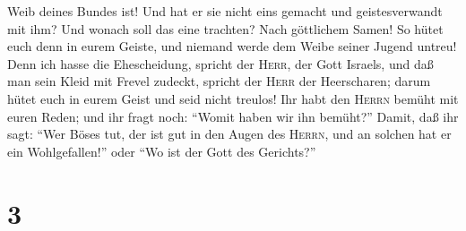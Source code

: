 Weib deines Bundes ist!  Und hat er sie nicht eins
gemacht und geistesverwandt mit ihm? Und wonach soll das eine trachten?
Nach göttlichem Samen! So hütet euch denn in eurem Geiste, und niemand
werde dem Weibe seiner Jugend untreu!  Denn ich hasse die
Ehescheidung, spricht der \textsc{Herr}, der Gott Israels, und daß man
sein Kleid mit Frevel zudeckt, spricht der \textsc{Herr} der
Heerscharen; darum hütet euch in eurem Geist und seid nicht treulos!
 Ihr habt den \textsc{Herrn} bemüht mit euren Reden; und
ihr fragt noch: ``Womit haben wir ihn bemüht?'' Damit, daß ihr sagt:
``Wer Böses tut, der ist gut in den Augen des \textsc{Herrn}, und an
solchen hat er ein Wohlgefallen!'' oder ``Wo ist der Gott des
Gerichts?''

\hypertarget{section-2}{%
\section{3}\label{section-2}}

